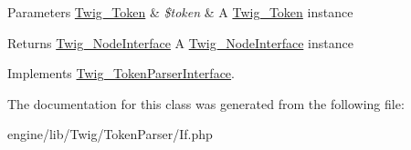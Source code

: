 \begin{DoxyParams}[1]{Parameters}
\hyperlink{class_twig___token}{Twig\+\_\+\+Token} & {\em \$token} & A \hyperlink{class_twig___token}{Twig\+\_\+\+Token} instance\\
\hline
\end{DoxyParams}
\begin{DoxyReturn}{Returns}
\hyperlink{interface_twig___node_interface}{Twig\+\_\+\+Node\+Interface} A \hyperlink{interface_twig___node_interface}{Twig\+\_\+\+Node\+Interface} instance 
\end{DoxyReturn}


Implements \hyperlink{interface_twig___token_parser_interface_a5dfa2e269321584fb74e8b43dabe0efd}{Twig\+\_\+\+Token\+Parser\+Interface}.



The documentation for this class was generated from the following file\+:\begin{DoxyCompactItemize}
\item 
engine/lib/\+Twig/\+Token\+Parser/If.\+php\end{DoxyCompactItemize}
